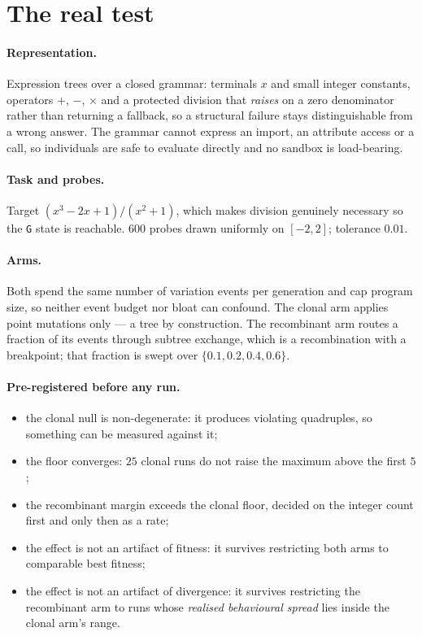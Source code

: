 \documentclass[11pt,a4paper]{article}
\theoremstyle{definition}
\theoremstyle{remark}
\begin{document}
\section{The real test}\label{sec:real}

\paragraph{Representation.} Expression trees over a closed grammar: terminals
$x$ and small integer constants, operators $+$, $-$, $\times$ and a protected
division that \emph{raises} on a zero denominator rather than returning a
fallback, so a structural failure stays distinguishable from a wrong answer. The
grammar cannot express an import, an attribute access or a call, so individuals
are safe to evaluate directly and no sandbox is load-bearing.

\paragraph{Task and probes.} Target $(x^3 - 2x + 1)/(x^2+1)$, which makes
division genuinely necessary so the \texttt{G} state is reachable. $600$ probes
drawn uniformly on $[-2,2]$; tolerance $0.01$.

\paragraph{Arms.} Both spend the same number of variation events per generation
and cap program size, so neither event budget nor bloat can confound. The clonal
arm applies point mutations only --- a tree by construction. The recombinant arm
routes a fraction of its events through subtree exchange, which is a
recombination with a breakpoint; that fraction is swept over
$\{0.1, 0.2, 0.4, 0.6\}$.

\paragraph{Pre-registered before any run.}
\begin{itemize}
\item[\textbf{P1}] the clonal null is non-degenerate: it produces violating
quadruples, so something can be measured against it;
\item[\textbf{P2}] the floor converges: $25$ clonal runs do not raise the maximum
above the first $5$;
\item[\textbf{P3}] the recombinant margin exceeds the clonal floor, decided on
the integer count first and only then as a rate;
\item[\textbf{P4}] the effect is not an artifact of fitness: it survives
restricting both arms to comparable best fitness;
\item[\textbf{P5}] the effect is not an artifact of divergence: it survives
restricting the recombinant arm to runs whose \emph{realised behavioural spread}
lies inside the clonal arm's range.
\end{itemize}
\end{document}
